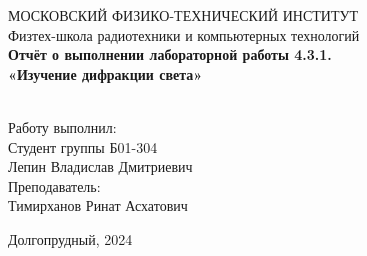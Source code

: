 \begin{center}
МОСКОВСКИЙ ФИЗИКО-ТЕХНИЧЕСКИЙ ИНСТИТУТ \\

\hfill \break
Физтех-школа радиотехники и компьютерных технологий\\
\vspace{5cm}
\large{\textbf{Отчёт о выполнении лабораторной работы 4.3.1. \\ «Изучение дифракции света»}}\\
\hfill \break
\\
\end{center}

\vspace{5cm}
 
\begin{flushright}
Работу выполнил:\\
Студент группы Б01-304\\
Лепин Владислав Дмитриевич\\
Преподаватель:\\
Тимирханов Ринат Асхатович\\
\end{flushright}
 
\vfill


\begin{center} Долгопрудный, 2024 \end{center}

\thispagestyle{empty}
\newpage
